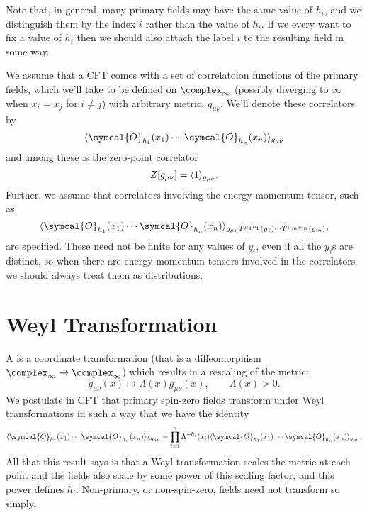 \documentclass[fleqn]{NotesClass}
\newcommand{\quantumField}[1]{\symcal{#1}}
\DeclarePairedDelimiter{\correlator}{\langle}{\rangle}
\begin{document}
    Note that, in general, many primary fields may have the same value of \(h_i\), and we distinguish them by the index \(i\) rather than the value of \(h_i\).
    If we every want to fix a value of \(h_i\) then we should also attach the label \(i\) to the resulting field in some way.
    
    We assume that a CFT comes with a set of correlatoion functions of the primary fields, which we'll take to be defined on \(\complex_{\infty}\) (possibly diverging to \(\infty\) when \(x_i = x_j\) for \(i \ne j\)) with arbitrary metric, \(g_{\mu\nu}\).
    We'll denote these correlators by
    \begin{equation}
        \correlator{\quantumField{O}_{h_1}(x_1) \dotsm \quantumField{O}_{h_n}(x_n)}_{g_{\mu\nu}}
    \end{equation}
    and among these is the zero-point correlator
    \begin{equation}
        Z[g_{\mu\nu}] = \correlator{1}_{g_{\mu\nu}}.
    \end{equation}
    Further, we assume that correlators involving the energy-momentum tensor, such as
    \begin{equation}
        \correlator{\quantumField{O}_{h_1}(x_1) \dotsm \quantumField{O}_{h_n}(x_n)}_{g_{\mu\nu}T^{\mu_1\nu_1}(y_1) \dotsm T^{\mu_m\nu_m}(y_m)},
    \end{equation}
    are specified.
    These need not be finite for any values of \(y_i\), even if all the \(y_i\)s are distinct, so when there are energy-momentum tensors involved in the correlators we should always treat them as distributions.
    
    \section{Weyl Transformation}
    A  is a coordinate transformation (that is a diffeomorphism \(\complex_{\infty} \to \complex_{\infty}\)) which results in a rescaling of the metric:
    \begin{equation}
        g_{\mu\nu}(x) \mapsto \Lambda(x)g_{\mu\nu}(x), \qquad \Lambda(x) > 0.
    \end{equation}
    We postulate in CFT that primary spin-zero fields transform under Weyl transformations in such a way that we have the identity
    \begin{equation}
        \correlator{\quantumField{O}_{h_1}(x_1) \dotsm \quantumField{O}_{h_n}(x_n)}_{\Lambda g_{\mu\nu}} = \prod_{i=1}^{n} \Lambda^{-h_i}(x_i) \correlator{\quantumField{O}_{h_1}(x_1) \dotsm \quantumField{O}_{h_n}(x_n)}_{g_{\mu\nu}}.
    \end{equation}
    All that this result says is that a Weyl transformation scales the metric at each point and the fields also scale by some power of this scaling factor, and this power defines \(h_i\).
    Non-primary, or non-spin-zero, fields need not transform so simply.
    
\end{document}
